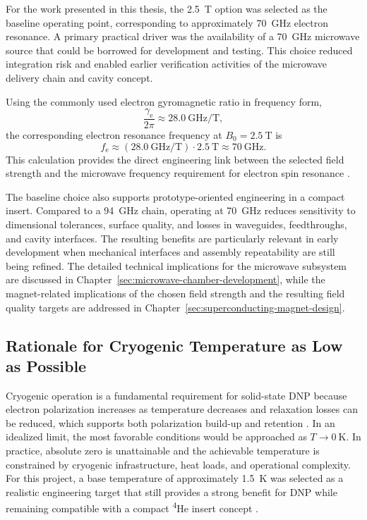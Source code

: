 \documentclass[FM,DP,EN,twoside]{tulthesis}
\begin{document}
For the work presented in this thesis, the \SI{2.5}{\tesla} option was selected as the baseline operating point, corresponding to approximately \SI{70}{\giga\hertz} electron resonance. A primary practical driver was the availability of a \SI{70}{\giga\hertz} microwave source that could be borrowed for development and testing. This choice reduced integration risk and enabled earlier verification activities of the microwave delivery chain and cavity concept.

Using the commonly used electron gyromagnetic ratio in frequency form,
\begin{equation}
\frac{\gamma_\mathrm{e}}{2\pi} \approx \SI{28.0}{\giga\hertz\per\tesla},
\label{eq:gammae-frequency-form}
\end{equation}
the corresponding electron resonance frequency at $B_0=\SI{2.5}{\tesla}$ is
\begin{equation}
f_\mathrm{e} \approx \left(\SI{28.0}{\giga\hertz\per\tesla}\right)\cdot \SI{2.5}{\tesla} \approx \SI{70}{\giga\hertz}.
\label{eq:2p5t-70ghz}
\end{equation}
This calculation provides the direct engineering link between the selected field strength and the microwave frequency requirement for electron spin resonance \cite{electron_gyromagnetic_ratio_ref}.


The baseline choice also supports prototype-oriented engineering in a compact insert. Compared to a \SI{94}{\giga\hertz} chain, operating at \SI{70}{\giga\hertz} reduces sensitivity to dimensional tolerances, surface quality, and losses in waveguides, feedthroughs, and cavity interfaces. The resulting benefits are particularly relevant in early development when mechanical interfaces and assembly repeatability are still being refined. The detailed technical implications for the microwave subsystem are discussed in Chapter~\ref{sec:microwave-chamber-development}, while the magnet-related implications of the chosen field strength and the resulting field quality targets are addressed in Chapter~\ref{sec:superconducting-magnet-design}.


\subsection{Rationale for Cryogenic Temperature as Low as Possible}
\label{subsec:rationale-low-temperature}
Cryogenic operation is a fundamental requirement for solid-state DNP because electron polarization increases as temperature decreases and relaxation losses can be reduced, which supports both polarization build-up and retention \cite{DNP_fundamentals_ref}. In an idealized limit, the most favorable conditions would be approached as $T \rightarrow \SI{0}{\kelvin}$. In practice, absolute zero is unattainable and the achievable temperature is constrained by cryogenic infrastructure, heat loads, and operational complexity. For this project, a base temperature of approximately \SI{1.5}{\kelvin} was selected as a realistic engineering target that still provides a strong benefit for DNP while remaining compatible with a compact \textsuperscript{4}He insert concept \cite{Kowalska2023MABudget}.
\end{document}
